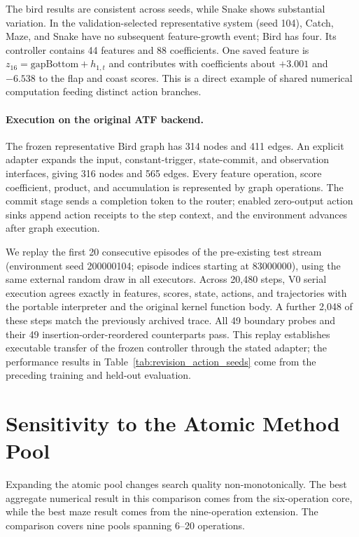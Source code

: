 The bird results are consistent across seeds, while Snake shows substantial
variation. In the validation-selected representative system (seed 104), Catch,
Maze, and Snake have no subsequent feature-growth event; Bird has four. Its
controller contains 44 features and 88 coefficients. One saved feature is
$z_{16}=\mathrm{gapBottom}+h_{1,t}$ and contributes with coefficients about
$+3.001$ and $-6.538$ to the flap and coast scores. This is a direct example of
shared numerical computation feeding distinct action branches.

\paragraph{Execution on the original ATF backend.}
The frozen representative Bird graph has 314 nodes and 411 edges. An explicit
adapter expands the input, constant-trigger, state-commit, and observation
interfaces, giving 316 nodes and 565 edges. Every feature operation, score
coefficient, product, and accumulation is represented by graph operations.
The commit stage sends a completion token to the router; enabled zero-output
action sinks append action receipts to the step context, and the environment
advances after graph execution.

We replay the first 20 consecutive episodes of the pre-existing test stream
(environment seed 200000104; episode indices starting at 83000000), using the
same external random draw in all executors. Across 20,480 steps, V0 serial
execution agrees exactly in features, scores, state, actions, and trajectories
with the portable interpreter and the original kernel function body. A further
2,048 of these steps match the previously archived trace. All 49 boundary
probes and their 49 insertion-order-reordered counterparts pass. This replay
establishes executable transfer of the frozen controller through the stated
adapter; the performance results in Table~\ref{tab:revision_action_seeds}
come from the preceding training and held-out evaluation.

\section{Sensitivity to the Atomic Method Pool}
\label{app:revision_pool}

Expanding the atomic pool changes search quality non-monotonically. The best
aggregate numerical result in this comparison comes from the six-operation
core, while the best maze result comes from the nine-operation extension.
The comparison covers nine pools spanning 6--20 operations.

